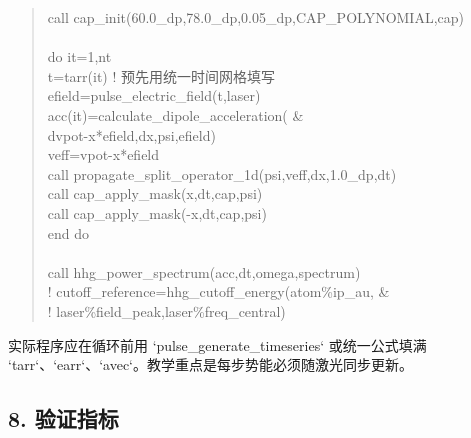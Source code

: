 \documentclass[UTF8,openany,11pt,fontset=fandol]{ctexbook}
\begin{document}
\begin{quote}
call cap\_init(60.0\_dp,78.0\_dp,0.05\_dp,CAP\_POLYNOMIAL,cap)\\
~\\
do it=1,nt\\
t=tarr(it) ! 预先用统一时间网格填写\\
efield=pulse\_electric\_field(t,laser)\\
acc(it)=calculate\_dipole\_acceleration( \&\\
dvpot-x*efield,dx,psi,efield)\\
veff=vpot-x*efield\\
call propagate\_split\_operator\_1d(psi,veff,dx,1.0\_dp,dt)\\
call cap\_apply\_mask(x,dt,cap,psi)\\
call cap\_apply\_mask(-x,dt,cap,psi)\\
end do\\
~\\
call hhg\_power\_spectrum(acc,dt,omega,spectrum)\\
! cutoff\_reference=hhg\_cutoff\_energy(atom\%ip\_au, \&\\
! laser\%field\_peak,laser\%freq\_central)
\end{quote}

实际程序应在循环前用 `pulse\_generate\_timeseries` 或统一公式填满
`tarr`、`earr`、`avec`。教学重点是每步势能必须随激光同步更新。

\subsection{\texorpdfstring{\textbf{8.
验证指标}}{8. 验证指标}}\label{ux9a8cux8bc1ux6307ux6807-1}
\end{document}
